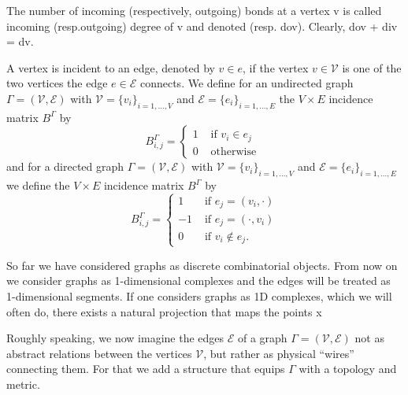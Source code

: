 The number of incoming (respectively, outgoing) bonds at a vertex v is called incoming (resp.outgoing) degree of v and denoted  (resp. dov). Clearly, dov + div = dv.

A vertex is incident to an edge, denoted by $v \in e$, if the vertex $v \in \mathcal{V}$ is one of the two vertices the edge $e \in \mathcal{E}$ connects. We define for an undirected graph $\Gamma = (\mathcal{V}, \mathcal{E})$ with $\mathcal{V} = \{v_i\}_{i = 1, \ldots, V}$ and $\mathcal{E} = \{e_i\}_{i = 1, \ldots, E}$ the $V \times E$ incidence matrix $B^{\Gamma}$ by  
\begin{equation}
    \label{incidence matrix undirected}
    B^{\Gamma}_{i, j}= \begin{cases} 1 & \text { if } v_i \in e_j \\ 0 & \text { otherwise } \end{cases}
\end{equation}
and for a directed graph $\Gamma = (\mathcal{V}, \mathcal{E})$ with $\mathcal{V} = \{v_i\}_{i = 1, \ldots, V}$ and $\mathcal{E} = \{e_i\}_{i = 1, \ldots, E}$ we define the $V \times E$ incidence matrix $B^{\Gamma}$ by 
\begin{equation}
    \label{incidence matrix directed}
    B^{\Gamma}_{i, j}= \begin{cases} 1 & \text { if } e_j = (v_i, \cdot) \\ -1 & \text { if } e_j = (\cdot, v_i) \\ 0 & \text { if } v_i \notin e_j. \end{cases}
\end{equation}


So far we have considered graphs as discrete combinatorial objects. From now on we consider graphs as 1-dimensional complexes and the edges will be treated as 1-dimensional segments. If one considers graphs as 1D complexes, which we will often do, there exists a natural projection that maps the points x


Roughly speaking, we now imagine the edges $\mathcal{E}$ of a graph $\Gamma = (\mathcal{V}, \mathcal{E})$ not as abstract relations between the vertices $\mathcal{V}$, but rather as physical “wires” connecting them. For that we add a structure that equips $\Gamma$ with a topology and metric. 

